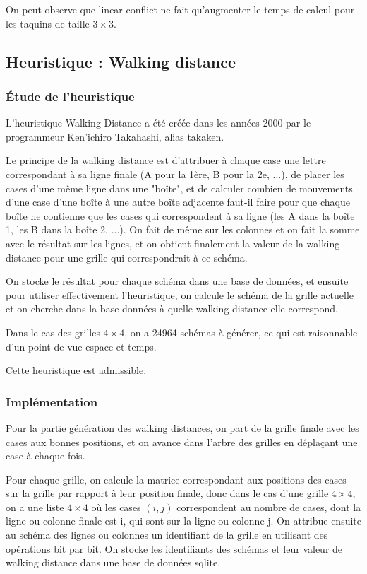\documentclass[a4paper, 12pt]{article}
\begin{document}
On peut observe que linear conflict ne fait qu'augmenter le temps de calcul pour les taquins de taille $3 \times 3$.
\subsection{Heuristique : Walking distance}

\subsubsection{Étude de l'heuristique}

L'heuristique Walking Distance a été créée dans les années 2000 par le programmeur Ken'ichiro Takahashi, alias takaken.

Le principe de la walking distance est d'attribuer à chaque case une lettre correspondant à sa ligne finale (A pour la 1ère, B pour la 2e, ...), de placer les cases d'une même ligne dans une "boîte", et de calculer combien de mouvements d'une case d'une boîte à une autre boîte adjacente faut-il faire pour que chaque boîte ne contienne que les cases qui correspondent à sa ligne (les A dans la boîte 1, les B dans la boîte 2, ...).
On fait de même sur les colonnes et on fait la somme avec le résultat sur les lignes, et on obtient finalement la valeur de la walking distance pour une grille qui correspondrait à ce schéma.

On stocke le résultat pour chaque schéma dans une base de données, et ensuite pour utiliser effectivement l'heuristique, on calcule le schéma de la grille actuelle et on cherche dans la base données à quelle walking distance elle correspond.

Dans le cas des grilles $4 \times 4$, on a 24964 schémas à générer, ce qui est raisonnable d'un point de vue espace et temps.

Cette heuristique est admissible.

\subsubsection{Implémentation}

Pour la partie génération des walking distances, on part de la grille finale avec les cases aux bonnes positions, et on avance dans l'arbre des grilles en déplaçant une case à chaque fois.

Pour chaque grille, on calcule la matrice correspondant aux positions des cases sur la grille par rapport à leur position finale, donc dans le cas d'une grille $4 \times 4$, on a une liste $4 \times 4$ où les cases $(i, j)$ correspondent au nombre de cases, dont la ligne ou colonne finale est i, qui sont sur la ligne ou colonne j.
On attribue ensuite au schéma des lignes ou colonnes un identifiant de la grille en utilisant des opérations bit par bit.
On stocke les identifiants des schémas et leur valeur de walking distance dans une base de données sqlite.
\end{document}
